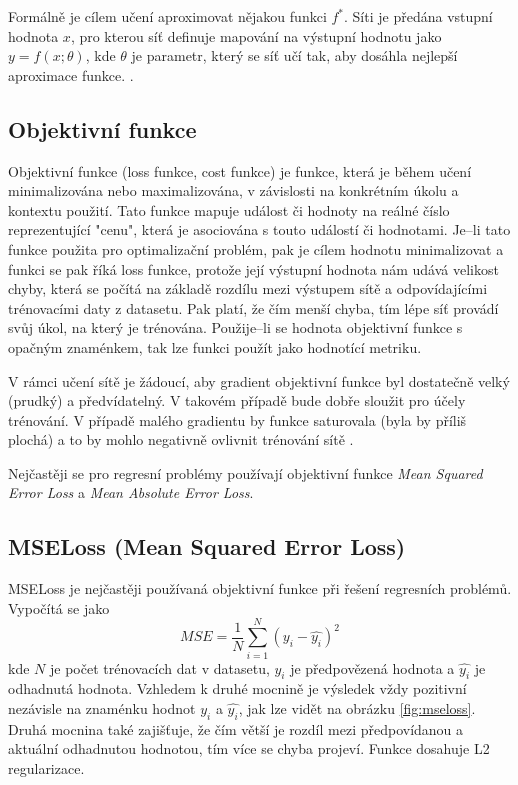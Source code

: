 Formálně je cílem učení aproximovat nějakou funkci $f^\ast$. Síti je předána vstupní hodnota $x$, pro kterou síť definuje mapování na výstupní hodnotu jako $y = f(x; \theta)$, kde $\theta$ je parametr, který se síť učí tak, aby dosáhla nejlepší aproximace funkce. \cite[p.~163]{mitdeeplearning}.


\subsection{Objektivní funkce}
Objektivní funkce (loss funkce, cost funkce) je funkce, která je během učení minimalizována nebo maximalizována, v závislosti na konkrétním úkolu a kontextu použití. Tato funkce mapuje událost či hodnoty na reálné číslo reprezentující  "cenu", která je asociována s touto událostí či hodnotami. Je--li tato funkce použita pro optimalizační problém, pak je cílem hodnotu minimalizovat a funkci se pak říká loss funkce, protože její výstupní hodnota nám udává velikost chyby, která se počítá na základě rozdílu mezi výstupem sítě a odpovídajícími trénovacími daty z datasetu. Pak platí, že čím menší chyba, tím lépe síť provádí svůj úkol, na který je trénována. Použije--li se hodnota objektivní funkce s opačným znaménkem, tak lze funkci použít jako hodnotící metriku.

V rámci učení sítě je žádoucí, aby gradient objektivní funkce byl dostatečně velký (prudký) a předvídatelný. V takovém případě bude dobře sloužit pro účely trénování. V případě malého gradientu by funkce saturovala (byla by příliš plochá) a to by mohlo negativně ovlivnit trénování sítě \cite{mitdeeplearning}. 

Nejčastěji se pro regresní problémy používají objektivní funkce \textit{Mean Squared Error Loss} a \textit{Mean Absolute Error Loss}.


\subsection*{MSELoss (Mean Squared Error Loss)}
MSELoss je nejčastěji používaná objektivní funkce při řešení regresních problémů. Vypočítá se jako
\begin{equation}
  MSE = \frac{1}{N}\sum_{i=1}^N(y_i - \hat{y_i})^2
\end{equation}
kde $N$ je počet trénovacích dat v datasetu, $y_i$ je předpovězená hodnota a $\hat{y_i}$ je odhadnutá hodnota. Vzhledem k druhé mocnině je výsledek vždy pozitivní nezávisle na znaménku hodnot $y_i$ a $\hat{y_i}$, jak lze vidět na obrázku \ref{fig:mseloss}. Druhá mocnina také zajišťuje, že čím větší je rozdíl mezi předpovídanou a aktuální odhadnutou hodnotou, tím více se chyba projeví. Funkce dosahuje L2 regularizace.

